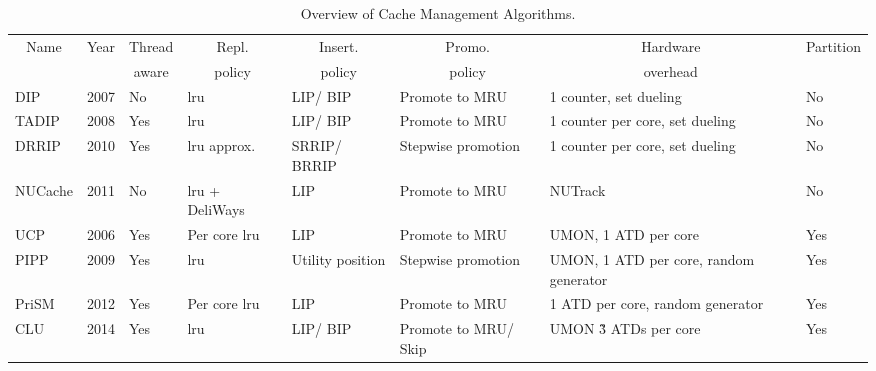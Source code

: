 \begin{table}[thb]
\begin{tabular}{|p{1.4cm}|p{0.5cm}|p{0.8cm}|p{1.2cm}|p{1.2cm}|p{1.4cm}|p{1.2cm}|p{1.0cm}|}
\hline
\multicolumn{1}{|c|}{Name} & \multicolumn{1}{c|}{Year} & \multicolumn{1}{c|}{Thread} & \multicolumn{1}{c|}{Repl.} & \multicolumn{1}{c|}{Insert.} & \multicolumn{1}{c|}{Promo.} & \multicolumn{1}{c|}{Hardware}    & \multicolumn{1}{c|}{Partition}     \\
\multicolumn{1}{|c|}{}          & \multicolumn{1}{c|}{}          & \multicolumn{1}{c|}{aware}  & \multicolumn{1}{c|}{policy}      & \multicolumn{1}{c|}{policy}    & \multicolumn{1}{c|}{policy}    & \multicolumn{1}{c|}{overhead\footnotemark}  & \multicolumn{1}{c|}{}       \\ \hline
DIP                             & 2007                           & No                          & \gls{lru}                              & LIP/ BIP                        & Promote to MRU            & 1 counter, set dueling    & No            \\ \hline
TADIP                           & 2008                          & Yes                         & \gls{lru}                              & LIP/ BIP                        & Promote to MRU            & 1 counter per core, set dueling  & No          \\ \hline
DRRIP                           & 2010                          & Yes                         & \gls{lru} approx.                      & SRRIP/ BRRIP                    & Stepwise promotion            & 1 counter per core, set dueling  & No          \\ \hline
NUCache                         & 2011                         & No                          & \gls{lru} + DeliWays     & LIP                            & Promote to MRU                 & NUTrack                            & No    \\ \hline
UCP                             & 2006                           & Yes                         & Per core \gls{lru}                     & LIP                            & Promote to MRU                 & UMON, 1 ATD per core   & Yes                \\ \hline
PIPP                            & 2009                           & Yes                         & \gls{lru}                              & Utility position               & Stepwise promotion            & UMON, 1 ATD per core, random generator & Yes \\ \hline
PriSM                           & 2012                           & Yes                         & Per core \gls{lru}                  & LIP                            & Promote to MRU                 & 1 ATD per core, random generator                       & Yes  \\ \hline
CLU                             & 2014                           & Yes                         & \gls{lru}                              & LIP/ BIP                        & Promote to MRU/ Skip            & UMON \~3 ATDs per core                & Yes  \\ \hline
\end{tabular}
\caption{Overview of Cache Management Algorithms.}
\label{tbl:algorithms}
\end{table}

